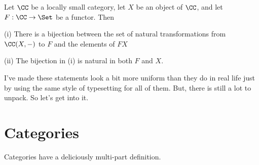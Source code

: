 \begin{lemma}[Yoneda]\label{yoneda6}
Let $\CC$ be a locally small category, let $X$ be an object of $\CC$, and let $F: \CC \to \Set$ be a functor. Then

(i) There is a bijection between the set of natural transformations from $\CC(X, -)$ to $F$ and the elements of $FX$

(ii) The bijection in (i) is natural in both $F$ and $X$.
\end{lemma}

\noindent
I've made these statements look a bit more uniform than they do in real life just by using the same style of typesetting for all of them. 
But, there is still a lot to unpack. So let's get into it.

\section{Categories}

Categories have a deliciously multi-part definition.

